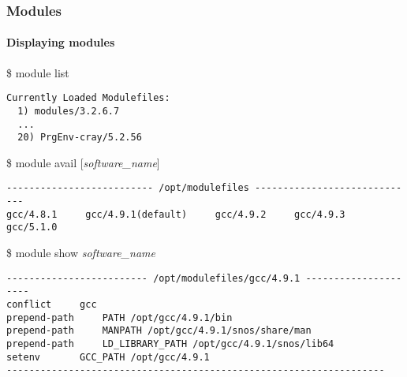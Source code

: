\begin{frame}[fragile]
\frametitle{Modules }
\framesubtitle{Displaying modules}
\begin{exampleblock}{\$ module list}
\scriptsize
\begin{verbatim}
Currently Loaded Modulefiles:
  1) modules/3.2.6.7
  ...
  20) PrgEnv-cray/5.2.56
\end{verbatim}
\end{exampleblock}

\begin{exampleblock}{\$ module avail [\textit{software\_name}]}
\scriptsize
\begin{verbatim}
-------------------------- /opt/modulefiles -----------------------------
gcc/4.8.1     gcc/4.9.1(default)     gcc/4.9.2     gcc/4.9.3    gcc/5.1.0
\end{verbatim}
\end{exampleblock}

\begin{exampleblock}{\$ module show \textit{software\_name}}
\scriptsize
\begin{verbatim}
------------------------- /opt/modulefiles/gcc/4.9.1 ---------------------
conflict	 gcc 
prepend-path	 PATH /opt/gcc/4.9.1/bin 
prepend-path	 MANPATH /opt/gcc/4.9.1/snos/share/man 
prepend-path	 LD_LIBRARY_PATH /opt/gcc/4.9.1/snos/lib64 
setenv		 GCC_PATH /opt/gcc/4.9.1 
-------------------------------------------------------------------
\end{verbatim}
\end{exampleblock}
\end{frame}

